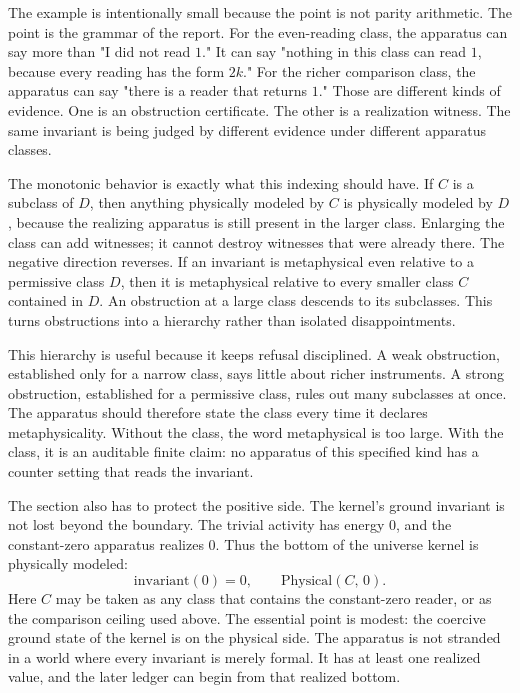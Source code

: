 The example is intentionally small because the point is not parity arithmetic.
The point is the grammar of the report. For the even-reading class, the
apparatus can say more than "I did not read \(1\)." It can say "nothing in this
class can read \(1\), because every reading has the form \(2k\)." For the richer
comparison class, the apparatus can say "there is a reader that returns \(1\)."
Those are different kinds of evidence. One is an obstruction certificate. The
other is a realization witness. The same invariant is being judged by different
evidence under different apparatus classes.

The monotonic behavior is exactly what this indexing should have. If \(C\) is a
subclass of \(D\), then anything physically modeled by \(C\) is physically
modeled by \(D\), because the realizing apparatus is still present in the larger
class. Enlarging the class can add witnesses; it cannot destroy witnesses that
were already there. The negative direction reverses. If an invariant is
metaphysical even relative to a permissive class \(D\), then it is metaphysical
relative to every smaller class \(C\) contained in \(D\). An obstruction at a
large class descends to its subclasses. This turns obstructions into a hierarchy
rather than isolated disappointments.

This hierarchy is useful because it keeps refusal disciplined. A weak
obstruction, established only for a narrow class, says little about richer
instruments. A strong obstruction, established for a permissive class, rules out many
subclasses at once. The apparatus should therefore state the class every time it
declares metaphysicality. Without the class, the word metaphysical is too large.
With the class, it is an auditable finite claim: no apparatus of this specified
kind has a counter setting that reads the invariant.

The section also has to protect the positive side. The kernel's ground invariant
is not lost beyond the boundary. The trivial activity has energy \(0\), and the
constant-zero apparatus realizes \(0\). Thus the bottom of the universe kernel is
physically modeled:
\[
  \mathrm{invariant}(0) = 0,
  \qquad
  \mathrm{Physical}(C,\,0).
\]
Here \(C\) may be taken as any class that contains the constant-zero reader, or
as the comparison ceiling used above. The essential point is modest: the
coercive ground state of the kernel is on the physical side. The apparatus is
not stranded in a world where every invariant is merely formal. It has at least
one realized value, and the later ledger can begin from that realized bottom.

